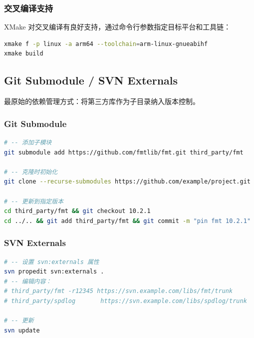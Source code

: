 \documentclass[12pt,a4paper,fontset=fandol]{ctexbook}
\begin{document}
\subsubsection*{交叉编译支持}

XMake 对交叉编译有良好支持，通过命令行参数指定目标平台和工具链：

\begin{lstlisting}[language=Bash, caption={XMake 交叉编译}]
xmake f -p linux -a arm64 --toolchain=arm-linux-gnueabihf
xmake build
\end{lstlisting}

\subsection{Git Submodule / SVN Externals}

最原始的依赖管理方式：将第三方库作为子目录纳入版本控制。

\subsubsection*{Git Submodule}

\begin{lstlisting}[language=Bash, caption={Git Submodule 基本操作}]
# -- 添加子模块
git submodule add https://github.com/fmtlib/fmt.git third_party/fmt

# -- 克隆时初始化
git clone --recurse-submodules https://github.com/example/project.git

# -- 更新到指定版本
cd third_party/fmt && git checkout 10.2.1
cd ../.. && git add third_party/fmt && git commit -m "pin fmt 10.2.1"
\end{lstlisting}

\subsubsection*{SVN Externals}

\begin{lstlisting}[language=Bash, caption={SVN Externals 配置}]
# -- 设置 svn:externals 属性
svn propedit svn:externals .
# -- 编辑内容：
# third_party/fmt -r12345 https://svn.example.com/libs/fmt/trunk
# third_party/spdlog       https://svn.example.com/libs/spdlog/trunk

# -- 更新
svn update
\end{lstlisting}
\end{document}
